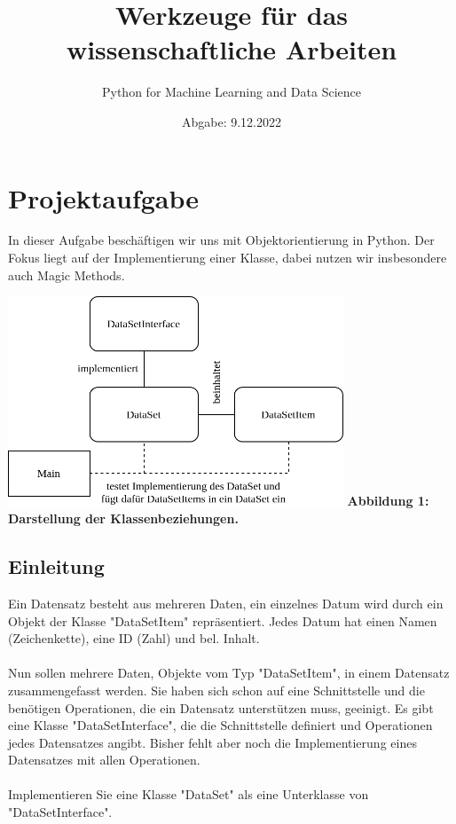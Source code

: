 \documentclass{article}
\begin{document}
	\title{Werkzeuge für das wissenschaftliche Arbeiten}
	\author{Python for Machine Learning and Data Science}
	\date{Abgabe: 9.12.2022}
	\maketitle

	\tableofcontents

	\section{Projektaufgabe}

		In dieser Aufgabe beschäftigen wir uns mit Objektorientierung in Python.
		Der Fokus liegt auf der Implementierung einer Klasse, dabei nutzen wir insbesondere auch Magic Methods. 

		\hspace*{2cm}\includegraphics[width=10cm]{./../diagram/classes_files.png}
		\hspace*{3cm}\scriptsize\bf Abbildung 1: \normalfont Darstellung der Klassenbeziehungen.\normalsize

		\subsection{Einleitung}

			Ein Datensatz besteht aus mehreren Daten, ein einzelnes Datum wird durch ein Objekt der Klasse "DataSetItem" repräsentiert.
			Jedes Datum hat einen Namen (Zeichenkette), eine ID (Zahl) und bel. Inhalt.\\
			\\
			Nun sollen mehrere Daten, Objekte vom Typ "DataSetItem", in einem Datensatz zusammengefasst werden.
			Sie haben sich schon auf eine Schnittstelle und die benötigen Operationen, die ein Datensatz unterstützen muss, geeinigt.
			Es gibt eine Klasse "DataSetInterface", die die Schnittstelle definiert und Operationen jedes Datensatzes angibt.
			Bisher fehlt aber noch die Implementierung eines Datensatzes mit allen Operationen.\\
			\\
			Implementieren Sie eine Klasse "DataSet" als eine Unterklasse von "DataSetInterface".\\
\end{document}
